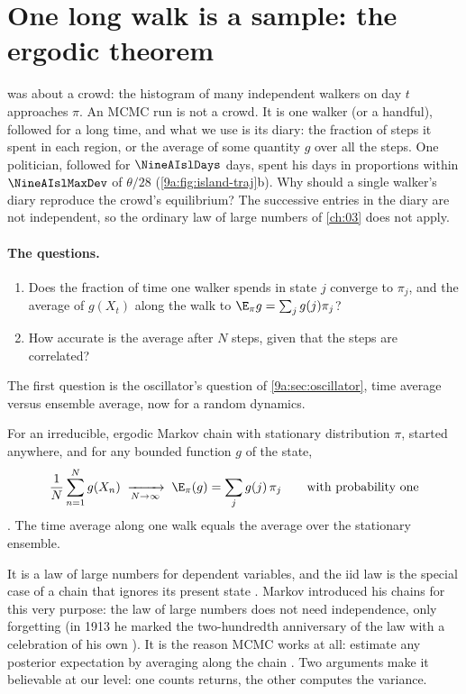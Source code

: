 \section{One long walk is a sample: the ergodic theorem}
\label{9a:sec:ergodic}

 was about a crowd: the histogram of many independent walkers on day
$t$ approaches $\pi$. An MCMC run is not a crowd. It is one walker (or a handful), followed for a
long time, and what we use is its diary: the fraction of steps it spent in each region, or the
average of some quantity $g$ over all the steps. One politician, followed for $\NineAIslDays$
days, spent his days in proportions within $\NineAIslMaxDev$ of $\theta/28$
(\cref{9a:fig:island-traj}b). Why should a single walker's diary reproduce the crowd's
equilibrium? The successive entries in the diary are not independent, so the ordinary law of
large numbers of \cref{ch:03} does not apply.

\paragraph{The questions.}
\begin{enumerate}[itemsep=1pt]
  \item Does the fraction of time one walker spends in state $j$ converge to $\pi_j$, and the
        average of $g(X_t)$ along the walk to $\E_\pi g=\sum_jg(j)\pi_j$?
  \item How accurate is the average after $N$ steps, given that the steps are correlated?
\end{enumerate}
The first question is the oscillator's question of \cref{9a:sec:oscillator}, time average
versus ensemble average, now for a random dynamics.

\begin{keyidea}
For an irreducible, ergodic Markov chain with stationary distribution $\pi$, started anywhere,
and for any bounded function $g$ of the state,
\begin{equation}
  \frac1N\sum_{n=1}^Ng(X_n)\;\xrightarrow[N\to\infty]{}\;\E_\pi(g)=\sum_jg(j)\,\pi_j
  \qquad\text{with probability one}
  \label{9a:eq:ergodic}
\end{equation}
. The time average along one walk equals the average over the
stationary ensemble.
\end{keyidea}

It is a law of large numbers for dependent variables, and the iid law is the special case of a
chain that ignores its present state . Markov introduced his chains for this very purpose: the law of large numbers does not need independence, only forgetting (in 1913 he marked the two-hundredth anniversary of the law with a celebration of his own ). It is the reason MCMC
works at all: estimate any posterior expectation by averaging along the chain
. Two arguments make it believable at our level: one counts returns, the other
computes the variance.

